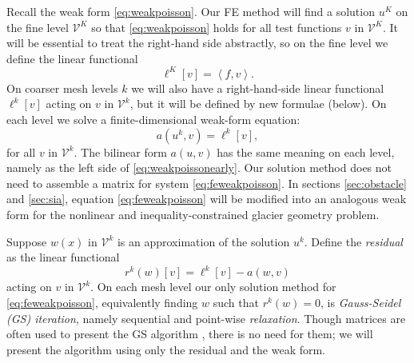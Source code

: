 \documentclass[letterpaper,final,12pt,reqno]{amsart}
\newcommand{\ip}[2]{\left<#1,#2\right>}
\begin{document}
Recall the weak form \eqref{eq:weakpoisson}.  Our FE method will find a solution $u^K$ on the fine level $\mathcal{V}^K$ so that \eqref{eq:weakpoisson} holds for all test functions $v$ in $\mathcal{V}^K$.  It will be essential to treat the right-hand side abstractly, so on the fine level we define the linear functional
\begin{equation}
  \ell^K[v] = \ip{f}{v}.  \label{eq:rhsfine}
\end{equation}
On coarser mesh levels $k$ we will also have a right-hand-side linear functional $\ell^k[v]$ acting on $v$ in $\mathcal{V}^k$, but it will be defined by new formulae (below).  On each level we solve a finite-dimensional weak-form equation:
\begin{equation}
  a(u^k,v) = \ell^k[v],  \label{eq:feweakpoisson}
\end{equation}
for all $v$ in $\mathcal{V}^k$.  The bilinear form $a(u,v)$ has the same meaning on each level, namely as the left side of \eqref{eq:weakpoissonearly}.  Our solution method does not need to assemble a matrix for system \eqref{eq:feweakpoisson}.  In sections \ref{sec:obstacle} and \ref{sec:sia}, equation \eqref{eq:feweakpoisson} will be modified into an analogous weak form for the nonlinear and inequality-constrained glacier geometry problem.

Suppose $w(x)$ in $\mathcal{V}^k$ is an approximation of the solution $u^k$.  Define the \emph{residual} as the linear functional
\begin{equation}
  r^k(w)[v] = \ell^k[v] - a(w,v)  \label{eq:residual}
\end{equation}
acting on $v$ in $\mathcal{V}^k$.  On each mesh level our only solution method for \eqref{eq:feweakpoisson}, equivalently finding $w$ such that $r^k(w)=0$, is \emph{Gauss-Seidel (GS) iteration}, namely sequential and point-wise \emph{relaxation}.  Though matrices are often used to present the GS algorithm \cite[for example]{Bueler2021,Greenbaum1997}, there is no need for them; we will present the algorithm using only the residual and the weak form.
\end{document}
